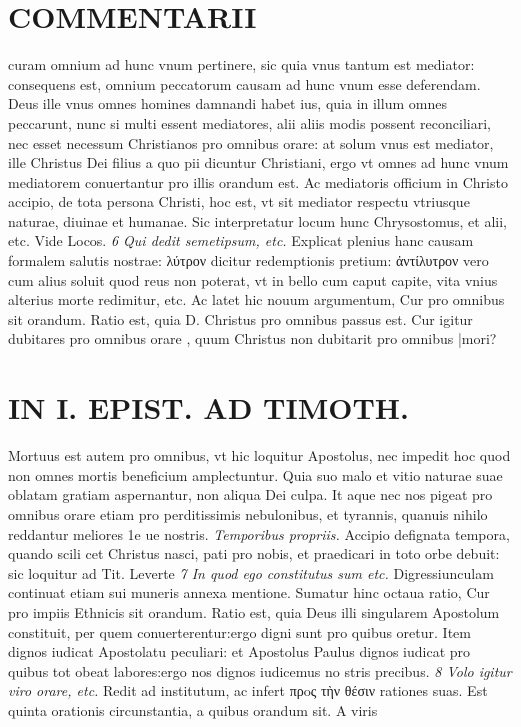 \documentclass{article}
\begin{document}
\begin{pages}
\section*{COMMENTARII }
\marginpar{[ p.50 ]}\pstart curam omnium ad hunc vnum pertinere, sic quia vnus tantum est mediator: consequens est, omnium peccatorum causam ad hunc vnum esse deferendam. Deus ille vnus omnes homines damnandi habet ius, quia in illum omnes peccarunt, nunc si multi essent mediatores, alii aliis modis possent reconciliari, nec esset necessum Christianos pro omnibus orare: at solum vnus est mediator, ille Christus Dei filius a quo pii dicuntur Christiani, ergo vt omnes ad hunc vnum mediatorem conuertantur pro illis orandum est. Ac mediatoris officium in Christo accipio, de tota persona Christi, hoc est, vt sit mediator respectu vtriusque naturae, diuinae et humanae. Sic interpretatur locum hunc Chrysostomus, et alii, etc. Vide Locos.  \pend
\textit{6 Qui dedit semetipsum, etc. }\pstart Explicat plenius hanc causam formalem salutis nostrae: λύτρον dicitur redemptionis pretium: ἀντίλυτρον vero cum alius soluit quod reus non poterat, vt in bello cum caput capite, vita vnius alterius morte redimitur, etc.  \pend\pstart Ac latet hic nouum argumentum, Cur pro omnibus sit orandum. Ratio est, quia D. Christus pro omnibus passus est. Cur igitur dubitares pro omnibus orare , quum Christus non dubitarit pro omnibus |mori?  \pend
\section*{IN I. EPIST. AD TIMOTH. }
\marginpar{[ p.5 ]}\pstart Mortuus est autem pro omnibus, vt hic loquitur Apostolus, nec impedit hoc quod non omnes mortis beneficium amplectuntur. Quia suo malo et vitio naturae suae oblatam gratiam aspernantur, non aliqua Dei culpa. It aque nec nos pigeat pro omnibus orare etiam pro perditissimis nebulonibus, et tyrannis, quanuis nihilo reddantur meliores 1e ue nostris.  \pend
\textit{Temporibus propriis. }\pstart Accipio defignata tempora, quando scili cet Christus nasci, pati pro nobis, et praedicari in toto orbe debuit: sic loquitur ad Tit. Leverte\pend
\textit{7 In quod ego constitutus sum etc. }\pstart Digressiunculam continuat etiam sui muneris annexa mentione. Sumatur hinc octaua ratio, Cur pro impiis Ethnicis sit orandum. Ratio est, quia Deus illi singularem Apostolum constituit, per quem conuerterentur:ergo digni sunt pro quibus oretur. Item dignos iudicat Apostolatu peculiari: et Apostolus Paulus dignos iudicat pro quibus tot obeat labores:ergo nos dignos iudicemus no stris precibus.  \pend
\textit{8 Volo igitur viro orare, etc. }\pstart Redit ad institutum, ac infert πρoς τὴν θέσιν rationes suas. Est quinta orationis circunstantia, a quibus orandum sit. A viris  \pend

\end{pages}
\end{document}
